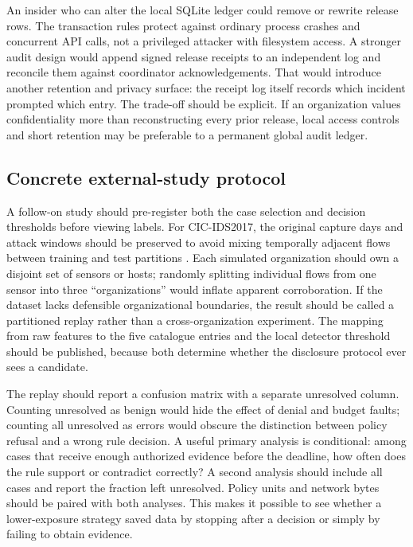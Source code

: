 \documentclass[conference,letterpaper]{IEEEtran}
\begin{document}
An insider who can alter the local SQLite ledger could remove or rewrite release rows. The transaction rules protect against ordinary process crashes and concurrent API calls, not a privileged attacker with filesystem access. A stronger audit design would append signed release receipts to an independent log and reconcile them against coordinator acknowledgements. That would introduce another retention and privacy surface: the receipt log itself records which incident prompted which entry. The trade-off should be explicit. If an organization values confidentiality more than reconstructing every prior release, local access controls and short retention may be preferable to a permanent global audit ledger.

\subsection{Concrete external-study protocol}
A follow-on study should pre-register both the case selection and decision thresholds before viewing labels. For CIC-IDS2017, the original capture days and attack windows should be preserved to avoid mixing temporally adjacent flows between training and test partitions \cite{cicdata,cicpaper}. Each simulated organization should own a disjoint set of sensors or hosts; randomly splitting individual flows from one sensor into three ``organizations'' would inflate apparent corroboration. If the dataset lacks defensible organizational boundaries, the result should be called a partitioned replay rather than a cross-organization experiment. The mapping from raw features to the five catalogue entries and the local detector threshold should be published, because both determine whether the disclosure protocol ever sees a candidate.

The replay should report a confusion matrix with a separate unresolved column. Counting unresolved as benign would hide the effect of denial and budget faults; counting all unresolved as errors would obscure the distinction between policy refusal and a wrong rule decision. A useful primary analysis is conditional: among cases that receive enough authorized evidence before the deadline, how often does the rule support or contradict correctly? A second analysis should include all cases and report the fraction left unresolved. Policy units and network bytes should be paired with both analyses. This makes it possible to see whether a lower-exposure strategy saved data by stopping after a decision or simply by failing to obtain evidence.
\end{document}
